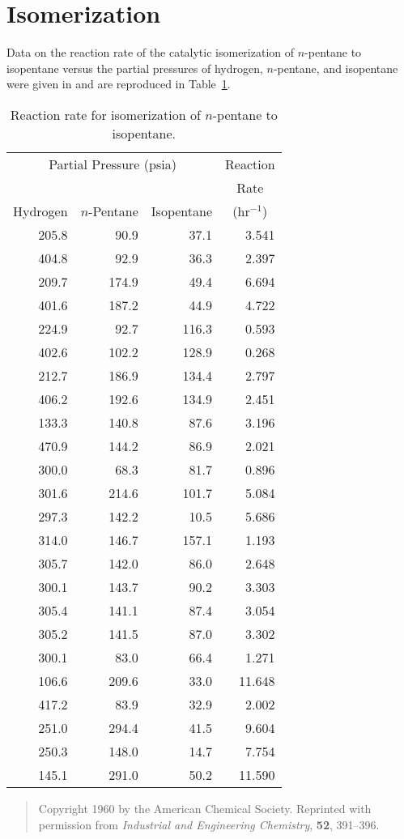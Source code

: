 \section{Isomerization}

Data on the reaction rate of the catalytic isomerization of
$n$-pentane to isopentane versus the partial pressures of hydrogen,
$n$-pentane, and isopentane were given in  and
are reproduced in Table~\ref{atbl:iso}.
\begin{table}
  \caption{\label{atbl:iso}
  Reaction rate for isomerization of $n$-pentane to isopentane.}
  \begin{center}
    \begin{tabular}{r r r r}
      \hline
      \multicolumn{3}{c}{Partial Pressure (psia)}&
      \multicolumn{1}{c}{Reaction}\\
      &&&\multicolumn{1}{c}{Rate}\\
      \multicolumn{1}{c}{Hydrogen}&\multicolumn{1}{c}{$n$-Pentane}&
      \multicolumn{1}{c}{Isopentane}&\multicolumn{1}{c}{(hr$^{-1}$)}\\
      \hline
      205.8&90.9&37.1&3.541\\
      404.8&92.9&36.3&2.397\\
      209.7&174.9&49.4&6.694\\
      401.6&187.2&44.9&4.722\\
      224.9&92.7&116.3&0.593\\
      402.6&102.2&128.9&0.268\\
      212.7&186.9&134.4&2.797\\
      406.2&192.6&134.9&2.451\\
      133.3&140.8&87.6&3.196\\
      470.9&144.2&86.9&2.021\\
      300.0&68.3&81.7&0.896\\
      301.6&214.6&101.7&5.084\\
      297.3&142.2&10.5&5.686\\
      314.0&146.7&157.1&1.193\\
      305.7&142.0&86.0&2.648\\
      300.1&143.7&90.2&3.303\\
      305.4&141.1&87.4&3.054\\
      305.2&141.5&87.0&3.302\\
      300.1&83.0&66.4&1.271\\
      106.6&209.6&33.0&11.648\\
      417.2&83.9&32.9&2.002\\
      251.0&294.4&41.5&9.604\\
      250.3&148.0&14.7&7.754\\
      145.1&291.0&50.2&11.590\\
      \hline
    \end{tabular}
  \end{center}
\begin{quote}\small
  Copyright 1960 by the American Chemical Society.  Reprinted with
  permission from {\em Industrial and Engineering Chemistry}, {\bf 52},
  391--396.
\end{quote}
\end{table}
